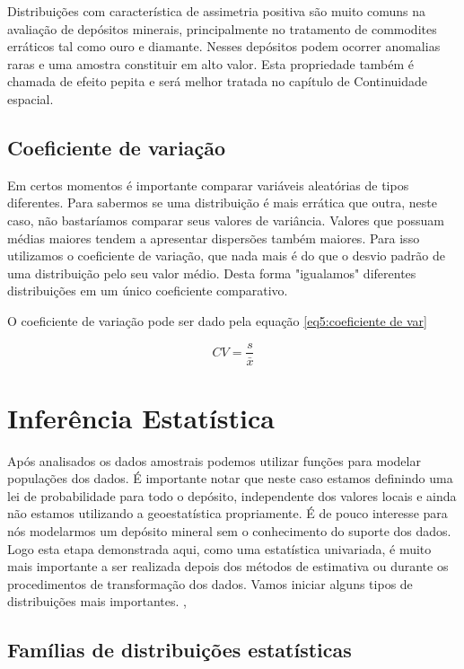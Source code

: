 Distribuições com característica de assimetria positiva são muito comuns na avaliação de depósitos minerais, principalmente no tratamento de commodites erráticos tal como ouro e diamante. Nesses depósitos podem ocorrer anomalias raras e uma amostra constituir em alto valor. Esta propriedade também é chamada de efeito pepita e será melhor tratada no capítulo de Continuidade espacial. 

\subsection{Coeficiente de variação}

Em certos momentos é importante comparar variáveis aleatórias de tipos diferentes. Para sabermos se uma distribuição é mais errática que outra, neste caso, não bastaríamos comparar seus valores de variância. Valores que possuam médias maiores tendem a apresentar dispersões também maiores. Para isso utilizamos o coeficiente de variação, que nada mais é do que o desvio padrão de uma distribuição pelo seu valor médio. Desta forma "igualamos" diferentes distribuições em um único coeficiente comparativo. 

O coeficiente de variação pode ser dado pela equação \eqref{eq5:coeficiente de var}

\begin{equation}\label{eq5:coeficiente de var}
	CV = \frac{s}{\bar{x}}
\end{equation}
 

\section {Inferência Estatística}

Após analisados os dados amostrais podemos utilizar funções para modelar populações dos dados. É importante notar que neste caso estamos definindo uma lei de probabilidade para todo o depósito, independente dos valores locais e ainda não estamos utilizando a geoestatística propriamente. É de pouco interesse para nós modelarmos um depósito mineral sem o conhecimento do suporte dos dados. Logo esta etapa demonstrada aqui, como uma estatística univariada, é muito mais importante a ser realizada depois dos métodos de estimativa ou durante os procedimentos de transformação dos dados. Vamos iniciar alguns tipos de distribuições mais importantes.
,
\subsection{Famílias de distribuições estatísticas}

